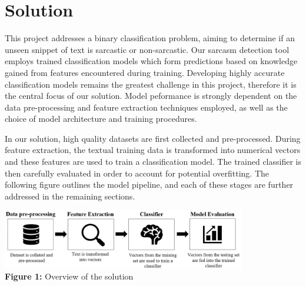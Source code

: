 \documentclass[12pt,a4paper]{article}
\begin{document}

\section{Solution}
\noindent This project addresses a binary classification problem, aiming to determine if an unseen snippet of text is sarcastic or non-sarcastic. Our sarcasm detection tool employs trained classification models which form  predictions based on knowledge gained from features encountered during training. Developing highly accurate classification models remains the greatest challenge in this project, therefore it is the central focus of our solution. Model peformance is strongly dependent on the data pre-processing and feature extraction techniques employed, as well as the choice of model architecture and training procedures. 

In our solution, high quality datasets are first collected and pre-processed. During feature extraction, the textual training data is transformed into numerical vectors and these features are used to train a classification model. The trained classifier is then carefully evaluated in order to account for potential overfitting. The following figure outlines the model pipeline, and each of these stages are further addressed in the remaining sections.

\begin{center}
	\includegraphics[width=0.8\textwidth]{Images/modelpipeline2.png}
	\label{Model Pipeline}\\
	\textbf{Figure 1:} Overview of the solution
\end{center}
\end{document}
